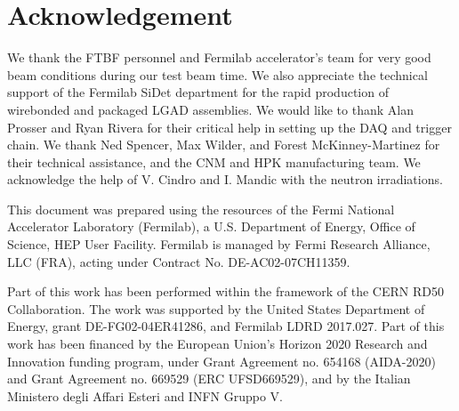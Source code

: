 \documentclass[preprint,1p]{elsarticle}
\begin{document}
\section*{Acknowledgement}

We thank the FTBF personnel and Fermilab accelerator's team for very good beam
conditions during our test beam time. We also appreciate the technical support
of the Fermilab SiDet department for the rapid production of wirebonded and
packaged LGAD assemblies. We would like to thank Alan Prosser and Ryan Rivera
for their critical help in setting up the DAQ and trigger chain. We thank Ned
Spencer, Max Wilder, and Forest McKinney-Martinez for their technical
assistance, and the CNM and HPK manufacturing team. We acknowledge the help of
V. Cindro and I. Mandic with the neutron irradiations. 

This document was prepared using the resources of the Fermi National Accelerator
Laboratory (Fermilab), a U.S. Department of Energy, Office of Science, HEP User
Facility. Fermilab is managed by Fermi Research Alliance, LLC (FRA), acting
under Contract No. DE-AC02-07CH11359.

Part of this work has been performed within the framework of the CERN RD50
Collaboration. The work was supported by the United States Department of Energy,
grant DE-FG02-04ER41286, and Fermilab LDRD 2017.027. Part of this work has been
financed by the European Union’s Horizon 2020 Research and Innovation funding
program, under Grant Agreement no. 654168 (AIDA-2020) and Grant Agreement no.
669529 (ERC UFSD669529), and by the Italian Ministero degli Affari Esteri and
INFN Gruppo V.



\end{document}
